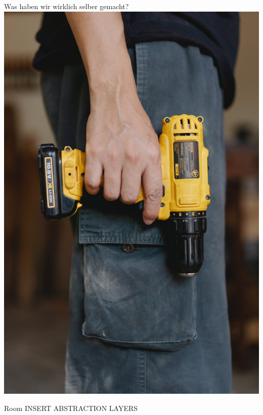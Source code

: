 \documentclass[aspectratio=169]{beamer}
\begin{document}
\begin{frame}{Was haben wir wirklich selber gemacht?}
\centering
\includegraphics[height=.8\textheight]{media/self.jpeg}
\end{frame}

\begin{frame}{Room}
INSERT ABSTRACTION LAYERS
\end{frame}
\end{document}
